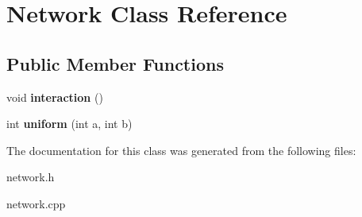 \hypertarget{classNetwork}{\section{Network Class Reference}
\label{classNetwork}
}
\subsection*{Public Member Functions}
\begin{DoxyCompactItemize}
\item 
\hypertarget{classNetwork_a4d752c12eae960a3d68d5ca2da10c64d}{void {\bfseries interaction} ()}\label{classNetwork_a4d752c12eae960a3d68d5ca2da10c64d}

\item 
\hypertarget{classNetwork_a7494750b15253ad4ae1c29efedab7b2b}{int {\bfseries uniform} (int a, int b)}\label{classNetwork_a7494750b15253ad4ae1c29efedab7b2b}

\end{DoxyCompactItemize}


The documentation for this class was generated from the following files\-:\begin{DoxyCompactItemize}
\item 
network.\-h\item 
network.\-cpp\end{DoxyCompactItemize}

